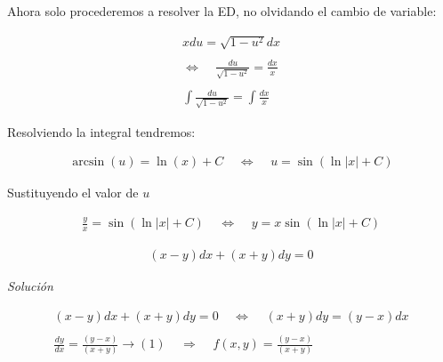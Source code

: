 Ahora solo procederemos a resolver la ED, no olvidando el cambio de variable:

\begin{equation*}
    \begin{gathered}
        xdu=\sqrt{1-u^{2}}dx\\\\
        \Leftrightarrow\;\;\;\;\frac{du}{\sqrt{1-u^{2}}}=\frac{dx}{x}\\\\
        \int\frac{du}{\sqrt{1-u^{2}}}=\int\frac{dx}{x}
    \end{gathered}
\end{equation*}

Resolviendo la integral tendremos:

\begin{equation*}
    \begin{gathered}
        \arcsin(u)=\ln(x)+C\;\;\;\;\Leftrightarrow\;\;\;\;u=\sin\left(\ln\left|x\right|+C\right)
    \end{gathered}
\end{equation*}

Sustituyendo el valor de \(\displaystyle u\)

\begin{equation*}
    \begin{gathered}
        \frac{y}{x}=\sin\left(\ln\left|x\right|+C\right)\;\;\;\;\Leftrightarrow\;\;\;\;y=x\sin\left(\ln\left|x\right|+C\right)
    \end{gathered}
\end{equation*}

\clearpage

\begin{equation}
    \begin{gathered}
        (x-y)dx+(x+y)dy=0
    \end{gathered}
\end{equation}

\textit{Solución}

\begin{equation*}
    \begin{gathered}
        (x-y)dx+(x+y)dy=0\;\;\;\;\Leftrightarrow\;\;\;\;(x+y)dy=(y-x)dx\\\\
        \frac{dy}{dx}=\frac{(y-x)}{(x+y)}\rightarrow(1)\;\;\;\;\Rightarrow\;\;\;\;f(x,y)=\frac{(y-x)}{(x+y)}
    \end{gathered}
\end{equation*}

